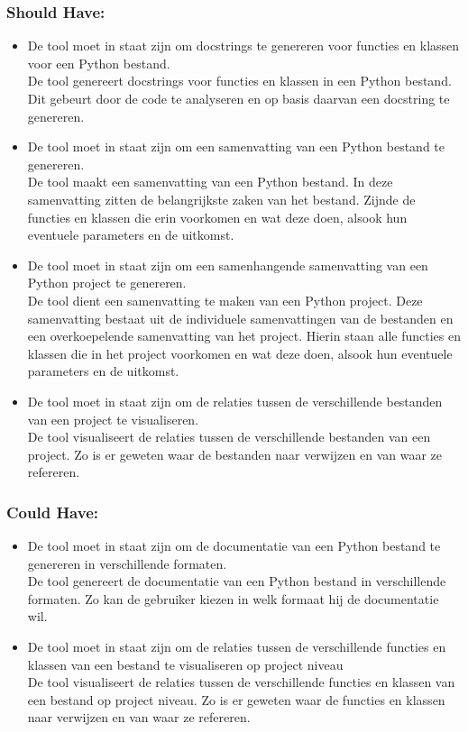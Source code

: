 \subsubsection{Should Have:}
\begin{itemize}
    \item De tool moet in staat zijn om docstrings te genereren voor functies en klassen voor een Python bestand.\\
    De tool genereert docstrings voor functies en klassen in een Python bestand. Dit gebeurt door de code te analyseren en op basis daarvan een docstring te genereren.
    \item De tool moet in staat zijn om een samenvatting van een Python bestand te genereren.\\
    De tool maakt een samenvatting van een Python bestand. In deze samenvatting zitten de belangrijkste zaken van het bestand.
    Zijnde de functies en klassen die erin voorkomen en wat deze doen, alsook hun eventuele parameters en de uitkomst.
    \item De tool moet in staat zijn om een samenhangende samenvatting van een Python project te genereren.\\
    De tool dient een samenvatting te maken van een Python project. Deze samenvatting bestaat uit de individuele samenvattingen van de bestanden en een overkoepelende samenvatting van het project.
    Hierin staan alle functies en klassen die in het project voorkomen en wat deze doen, alsook hun eventuele parameters en de uitkomst.
    \item De tool moet in staat zijn om de relaties tussen de verschillende bestanden van een project te visualiseren.\\
    De tool visualiseert  de relaties tussen de verschillende bestanden van een project. Zo is er geweten waar de bestanden naar verwijzen en van waar ze refereren.
\end{itemize}

\subsubsection{Could Have:}
\begin{itemize}
    \item De tool moet in staat zijn om de documentatie van een Python bestand te genereren in verschillende formaten.\\
    De tool genereert de documentatie van een Python bestand in verschillende formaten. Zo kan de gebruiker kiezen in welk formaat hij de documentatie wil.
    \item De tool moet in staat zijn om de relaties tussen de verschillende functies en klassen van een bestand te visualiseren op project niveau\\
    De tool visualiseert de relaties tussen de verschillende functies en klassen van een bestand op project niveau. Zo is er geweten waar de functies en klassen naar verwijzen en van waar ze refereren.
\end{itemize}

